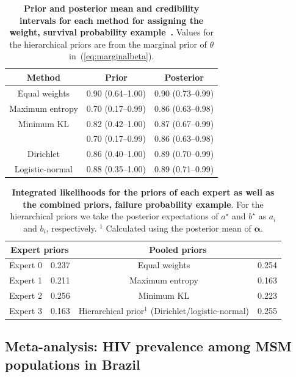 \documentclass[a4paper, notitlepage, 11pt]{article}
\begin{document}
\begin{table}[ht]
\caption{\textbf{Prior and posterior mean and credibility intervals for each method for assigning the weight, survival probability example~\citep{Savchuk1994}.}
Values for the hierarchical priors are from the marginal prior of $\theta$ in~(\ref{eq:marginalbeta}).
}
\centering
\begin{tabular}{ccc}
 \hline
Method & Prior & Posterior  \\ 
 \hline
 Equal weights & 0.90 (0.64--1.00) & 0.90 (0.73--0.99) \\ 
 Maximum entropy &  0.70 (0.17--0.99) & 0.86 (0.63--0.98) \\ 
 Minimum KL  &  0.82 (0.42--1.00) & 0.87 (0.67--0.99) \\ 
 \cite{Rufo2012B} & 0.70 (0.17--0.99) & 0.86 (0.63--0.98)\\
 Dirichlet  & 0.86 (0.40--1.00) & 0.89 (0.70--0.99) \\ 
 Logistic-normal & 0.88 (0.35--1.00) & 0.89 (0.71--0.99) \\ 
  \hline
\end{tabular}
\label{tab:prior_posteriorsSavchuk}
\end{table}


\begin{table}[ht]
\caption{\textbf{Integrated likelihoods for the priors of each expert as well as the combined priors, failure probability example}.
For the hierarchical priors we take the posterior expectations of $a^\star$ and $b^\star$ as $a_i$ and $b_i$, respectively.
$^1$ Calculated using the posterior mean of $\boldsymbol\alpha$. }
\centering
\begin{tabular}{cccc}
   \hline
   \multicolumn{2}{c}{Expert priors} &  \multicolumn{2}{c}{Pooled priors} \\
   \hline
   Expert 0 & 0.237 & Equal weights & 0.254\\
   Expert 1 & 0.211 & Maximum entropy & 0.163 \\
   Expert 2 & 0.256 & Minimum KL & 0.223 \\ 
   Expert 3 & 0.163 & Hierarchical prior$^1$ (Dirichlet/logistic-normal) & 0.255 \\
   \hline
\end{tabular}
\label{tab:marglikes}
\end{table}

\subsection{Meta-analysis: HIV prevalence among MSM populations in Brazil}
\label{sec:metaAnalysis}
\end{document}
